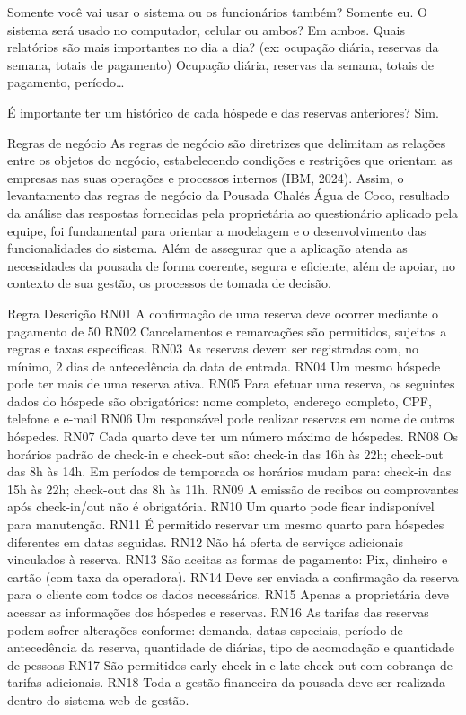 Somente você vai usar o sistema ou os funcionários também?
Somente eu.
O sistema será usado no computador, celular ou ambos?
Em ambos.
Quais relatórios são mais importantes no dia a dia? (ex: ocupação diária, reservas da semana, totais de pagamento)
Ocupação diária, reservas da semana, totais de pagamento, período…


É importante ter um histórico de cada hóspede e das reservas anteriores?
Sim.


Regras de negócio
As regras de negócio são diretrizes que delimitam as relações entre os objetos do negócio, estabelecendo condições e restrições que orientam as empresas nas suas operações e processos internos (IBM, 2024).
Assim, o levantamento das regras de negócio da Pousada Chalés Água de Coco, resultado da análise das respostas fornecidas pela proprietária ao questionário aplicado pela equipe, foi fundamental para orientar a modelagem e o desenvolvimento das funcionalidades do sistema. Além de assegurar que a aplicação atenda as necessidades da pousada de forma coerente, segura  e eficiente, além de apoiar, no contexto de sua gestão, os processos de tomada de decisão. 




Regra
Descrição 
RN01
A confirmação de uma reserva deve ocorrer mediante o pagamento de 50%
RN02
Cancelamentos e remarcações são permitidos, sujeitos a regras e taxas específicas.
RN03
As reservas devem ser registradas com, no mínimo, 2 dias de antecedência da data de entrada.
RN04
Um mesmo hóspede pode ter mais de uma reserva ativa.
RN05
Para efetuar uma reserva, os seguintes dados do hóspede são obrigatórios: nome completo, endereço completo, CPF, telefone e e-mail
RN06
Um responsável pode realizar reservas em nome de outros hóspedes.
RN07
Cada quarto deve ter um número máximo de hóspedes.
RN08
Os horários padrão de check-in e check-out são: check-in das 16h às 22h; check-out das 8h às 14h. Em períodos de temporada os horários mudam para:  check-in das 15h às 22h; check-out das 8h às 11h.
RN09
A emissão de recibos ou comprovantes após check-in/out não é obrigatória.
RN10
Um  quarto pode ficar indisponível para manutenção.
RN11
É permitido reservar um mesmo quarto para hóspedes diferentes em datas seguidas.
RN12
Não há oferta de serviços adicionais vinculados à reserva.
RN13
São aceitas as formas de pagamento: Pix, dinheiro e cartão (com taxa da operadora).
RN14
Deve ser enviada a confirmação da reserva para o cliente com todos os dados necessários.
RN15
Apenas a proprietária deve acessar as informações dos hóspedes e reservas.
RN16
As tarifas das reservas podem sofrer alterações conforme: demanda, datas especiais, período de antecedência da reserva, quantidade de diárias, tipo de acomodação e quantidade de pessoas
RN17
São permitidos early check-in e late check-out com cobrança de tarifas adicionais.
RN18
Toda a gestão financeira da pousada deve ser realizada dentro do sistema web de gestão.


